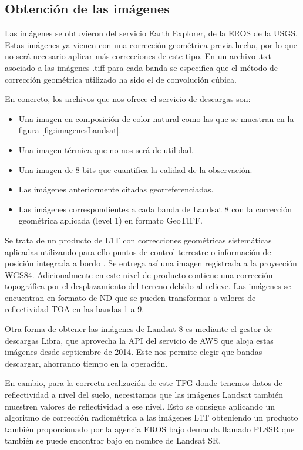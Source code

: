 \subsection{Obtención de las imágenes}
Las imágenes se obtuvieron del servicio Earth Explorer, de la \ac{EROS} de la \ac{USGS}. Estas imágenes ya vienen con una corrección geométrica previa hecha, por lo que no será necesario aplicar más correcciones de este tipo. En un archivo .txt asociado a las imágenes .tiff para cada banda se especifica que el método de corrección geométrica utilizado ha sido el de convolución cúbica.\Sep

En concreto, los archivos que nos ofrece el servicio de descargas son:

\begin{itemize}
	\item Una imagen en composición de color natural como las que se muestran en la figura \ref{fig:imagenesLandsat}.
	\item Una imagen térmica que no nos será de utilidad.
	\item Una imagen de 8 bits que cuantifica la calidad de la observación.
	\item Las imágenes anteriormente citadas georreferenciadas.
	\item Las imágenes correspondientes a cada banda de Landsat 8 con la corrección geométrica aplicada (level 1) en formato GeoTIFF.
\end{itemize}\Sep

Se trata de un producto de \ac{L1T} con correcciones geométricas sistemáticas aplicadas utilizando para ello puntos de control terrestre o información de posición integrada a bordo \citep{Ariza2013}. Se entrega así una imagen registrada a la proyección WGS84. Adicionalmente en este nivel de producto contiene una corrección topográfica por el desplazamiento del terreno debido al relieve. Las imágenes se encuentran en formato de \ac{ND} que se pueden transformar a valores de reflectividad \ac{TOA} en las bandas 1 a 9.\Sep

Otra forma de obtener las imágenes de Landsat 8 es mediante el gestor de descargas Libra, que aprovecha la API del servicio de \ac{AWS} que aloja estas imágenes desde septiembre de 2014. Este nos permite elegir que bandas descargar, ahorrando tiempo en la operación.\Sep

En cambio, para la correcta realización de este \ac{TFG} donde tenemos datos de reflectividad a nivel del suelo, necesitamos que las imágenes Landsat también muestren valores de reflectividad a ese nivel. Esto se consigue aplicando un algoritmo de corrección radiométrica a las imágenes \ac{L1T} obteniendo un producto también proporcionado por la agencia \ac{EROS} bajo demanda llamado \ac{PL8SR} \citep{USGS2015} que también se puede encontrar bajo en nombre de Landsat SR.\Sep

